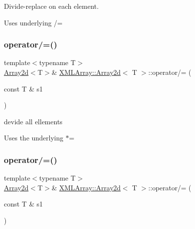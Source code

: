 Divide-\/replace on each element. 

Uses underlying /= \mbox{\label{classXMLArray_1_1Array2d_aa699e2de82efb77e8e5e875a63eb7d8b}} 
\subsubsection{\texorpdfstring{operator/=()}{operator/=()}\hspace{0.1cm}{\footnotesize\ttfamily [4/6]}}
{\footnotesize\ttfamily template$<$typename T$>$ \\
\mbox{\hyperlink{classXMLArray_1_1Array2d}{Array2d}}$<$T$>$\& \mbox{\hyperlink{classXMLArray_1_1Array2d}{X\+M\+L\+Array\+::\+Array2d}}$<$ T $>$\+::operator/= (\begin{DoxyParamCaption}\item[{const T \&}]{s1 }\end{DoxyParamCaption})\hspace{0.3cm}{\ttfamily [inline]}}



devide all ellements 

Uses the underlying $\ast$= \mbox{\label{classXMLArray_1_1Array2d_aa699e2de82efb77e8e5e875a63eb7d8b}} 
\subsubsection{\texorpdfstring{operator/=()}{operator/=()}\hspace{0.1cm}{\footnotesize\ttfamily [5/6]}}
{\footnotesize\ttfamily template$<$typename T$>$ \\
\mbox{\hyperlink{classXMLArray_1_1Array2d}{Array2d}}$<$T$>$\& \mbox{\hyperlink{classXMLArray_1_1Array2d}{X\+M\+L\+Array\+::\+Array2d}}$<$ T $>$\+::operator/= (\begin{DoxyParamCaption}\item[{const T \&}]{s1 }\end{DoxyParamCaption})\hspace{0.3cm}{\ttfamily [inline]}}



